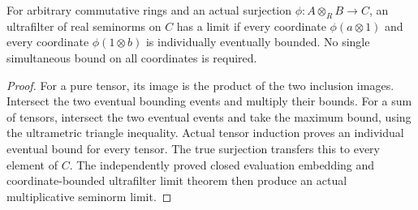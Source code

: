 \begin{theorem}
\label{spectrum:tensor-coordinate-ultrafilter-limit}
\leanok
{}
For arbitrary commutative rings and an actual surjection
$\phi:A\otimes_R B\to C$, an ultrafilter of real seminorms on $C$ has a
limit if every coordinate $\phi(a\otimes1)$ and every coordinate
$\phi(1\otimes b)$ is individually eventually bounded.
No single simultaneous bound on all coordinates is required.
\end{theorem}
\begin{proof}
For a pure tensor, its image is the product of the two inclusion images.
Intersect the two eventual bounding events and multiply their bounds.
For a sum of tensors, intersect the two eventual events and take the
maximum bound, using the ultrametric triangle inequality. Actual tensor
induction proves an individual eventual bound for every tensor. The true
surjection transfers this to every element of $C$. The independently
proved closed evaluation embedding and coordinate-bounded ultrafilter
limit theorem then produce an actual multiplicative seminorm limit.
\end{proof}


